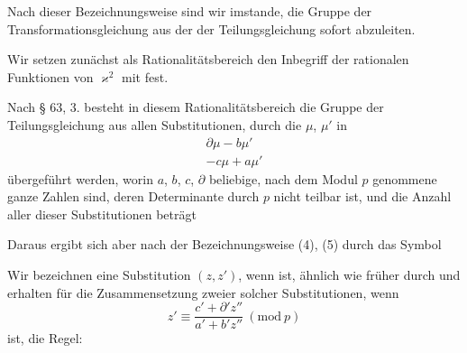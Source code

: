 
Nach dieser Bezeichnungsweise sind wir imstande, die Gruppe der Transformationsgleichung aus der der Teilungsgleichung sofort abzuleiten.

Wir setzen zunächst als Rationalitätsbereich den Inbegriff der rationalen Funktionen von $\varkappa^2$ mit  fest.

Nach § 63, 3. besteht in diesem Rationalitätsbereich die Gruppe der Teilungsgleichung aus allen Substitutionen, durch die $\mu$, $\mu'$ in
\[
\begin{array}{c} \partial \mu - b \mu' \\ -c \mu + a \mu' \end{array}
\]
übergeführt werden, worin $a$, $b$, $c$, $\partial$ beliebige, nach dem Modul $p$ genommene ganze Zahlen sind, deren Determinante
durch $p$ nicht teilbar ist, und die Anzahl aller dieser Substitutionen beträgt

Daraus ergibt sich aber nach der Bezeichnungsweise (4), (5)  durch das Symbol

Wir bezeichnen eine Substitution $(z, z')$, wenn
ist, ähnlich wie früher durch
und erhalten für die Zusammensetzung zweier solcher Substitutionen, wenn
\[
z' \equiv \frac{c'+\partial' z''}{a'+b'z''} \ (\mathrm{mod}\ p)
\]
ist, die Regel:
